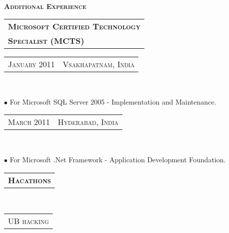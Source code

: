 \documentclass[10pt,a4paper,oneside]{article}
\begin{document}
\begin{minipage}[t]{0.33\textwidth}
{        }
        \vspace{10pt}\\
        \textcolor{light-gray}{\textbf{\large A\textsc{dditional} E\textsc{xperience}}}
        \vspace{10pt}\\
        \begin{tabular}{l}
            \textbf{\normalsize M\textsc{icrosoft} C\textsc{ertified} T\textsc{echnology}}\\
            {\normalsize \textbf{S\textsc{pecialist} (MCTS)}}
        \end{tabular}
        \vspace{2pt}
        \textcolor{light-gray}{
            \begin{tabular}{c|c}
                {\small J\textsc{anuary 2011}}
                &{\small V\textsc{sakhapatnam}, I\textsc{ndia}}
            \end{tabular}
        }\\
        \vspace{-12pt}
        \begin{adjustwidth}{7pt}{0pt}
            {\footnotesize $\bullet$ For Microsoft SQL Server 2005 - Implementation and Maintenance.}\\
        \end{adjustwidth}
        \vspace{-6pt} 
        \textcolor{light-gray}{
            \begin{tabular}{c|c}
                {\small M\textsc{arch 2011}}
                &{\small H\textsc{yderabad}, I\textsc{ndia}}
            \end{tabular}
        }\\
        \vspace{-12pt}
        \begin{adjustwidth}{7pt}{0pt}
        {\footnotesize $\bullet$ For Microsoft .Net Framework - Application Development Foundation.}\\
        \end{adjustwidth}
        \begin{tabular}{c}
            \textbf{\normalsize H\textsc{acathons}}
        \end{tabular}\\
        \begin{tabular}{c}
            {\small UB\textsc{ hacking}}
        \end{tabular}\\
        \textcolor{light-gray}{
            \begin{tabular}{c|c}

\end{tabular}}
\end{minipage}
\end{document}
